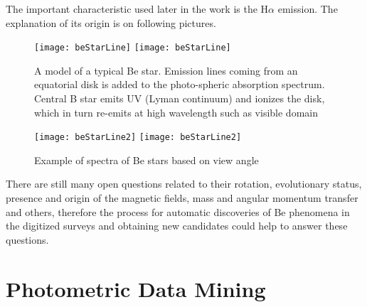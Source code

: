 The important characteristic used later in the work is the H$\alpha$
emission. The explanation of its origin is on following pictures.


    \begin{figure}[!htbp]
      \begin{center}
        \leavevmode
        \ifpdf
        \texttt{[image: beStarLine]}
        \else
        \texttt{[image: beStarLine]}
        \fi
        \caption{A model of a typical Be star. Emission lines coming
          from an equatorial disk is added to the photo-spheric
          absorption spectrum. Central B star emits UV (Lyman
          continuum) and ionizes the disk, which in turn re-emits at
          high wavelength such as visible domain
          \citep{hirata1984star}}
        \label{Figjhk_be_b}
      \end{center}
    \end{figure}


    \begin{figure}[!htbp]
      \begin{center}
        \leavevmode
        \ifpdf
        \texttt{[image: beStarLine2]}
        \else
        \texttt{[image: beStarLine2]}
        \fi
        \caption{Example of spectra of Be stars based on view angle
          \citep{slettebak1988stars}}
        \label{Figjhk_be_b}
      \end{center}
    \end{figure}
 
\clearpage

    There are still many open questions related to their rotation,
    evolutionary status, presence and origin of the magnetic fields,
    mass and angular momentum transfer and others, therefore the
    process for automatic discoveries of Be phenomena in the digitized
    surveys and obtaining new candidates could help to answer these
    questions.


\section{Photometric Data Mining}


